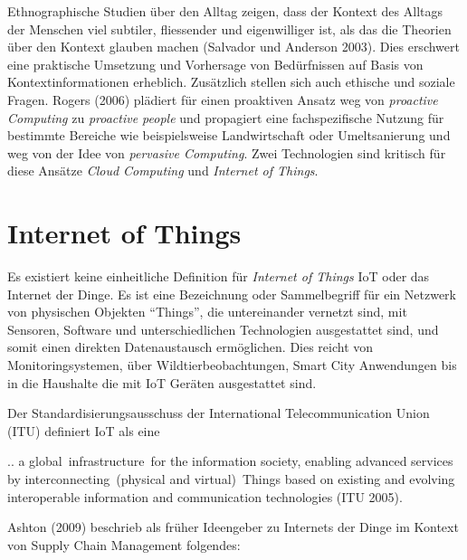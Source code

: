 \documentclass[
  11pt,
  a4paper,
  oneside, openany  ,captions=tableheading
]{scrbook}
\theoremstyle{remark}
\renewenvironment{quote}{\begin{customblockquote}\list{}{\rightmargin=0em\leftmargin=0em}%
\item\relax\color{blockquote-text}\ignorespaces}{\unskip\unskip\endlist\end{customblockquote}}
\begin{document}
Ethnographische Studien über den Alltag zeigen, dass der Kontext des
Alltags der Menschen viel subtiler, fliessender und eigenwilliger ist,
als das die Theorien über den Kontext glauben machen (Salvador und
Anderson 2003). Dies erschwert eine praktische Umsetzung und Vorhersage
von Bedürfnissen auf Basis von Kontextinformationen erheblich.
Zusätzlich stellen sich auch ethische und soziale Fragen. Rogers (2006)
plädiert für einen proaktiven Ansatz weg von \emph{proactive Computing}
zu \emph{proactive people} und propagiert eine fachspezifische Nutzung
für bestimmte Bereiche wie beispielsweise Landwirtschaft oder
Umeltsanierung und weg von der Idee von \emph{pervasive Computing}. Zwei
Technologien sind kritisch für diese Ansätze \emph{Cloud Computing} und
\emph{Internet of Things}.

\section{Internet of Things}\label{internet-of-things}

Es existiert keine einheitliche Definition für \emph{Internet of Things}
IoT oder das Internet der Dinge. Es ist eine Bezeichnung oder
Sammelbegriff für ein Netzwerk von physischen Objekten ``Things'', die
untereinander vernetzt sind, mit Sensoren, Software und
unterschiedlichen Technologien ausgestattet sind, und somit einen
direkten Datenaustausch ermöglichen. Dies reicht von Monitoringsystemen,
über Wildtierbeobachtungen, Smart City Anwendungen bis in die Haushalte
die mit IoT Geräten ausgestattet sind.

Der Standardisierungsausschuss der International Telecommunication Union
(ITU) definiert IoT als eine

\begin{quote}
.. a global~infrastructure~for the information society, enabling
advanced services by interconnecting~(physical and virtual)~Things based
on existing and evolving interoperable information and communication
technologies (ITU 2005).
\end{quote}

Ashton (2009) beschrieb als früher Ideengeber zu Internets der Dinge im
Kontext von Supply Chain Management folgendes:
\end{document}
